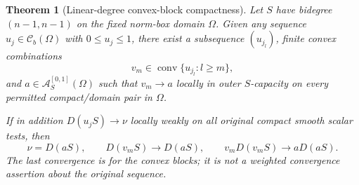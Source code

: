 \documentclass[11pt,a4paper]{article}
\numberwithin{equation}{section}
\newtheorem{theorem}{Theorem}[section]
\theoremstyle{definition}
\theoremstyle{remark}
\newcommand{\Cb}{\mathcal C_b}
\begin{document}
\begin{theorem}[Linear-degree convex-block compactness]
\label{thm:r3-linear-convex-blocks}
Let $S$ have bidegree $(n-1,n-1)$ on the fixed norm-box domain
$\Omega$. Given any sequence $u_j\in\Cb(\Omega)$ with
$0\leq u_j\leq1$, there exist a subsequence $(u_{j_l})$, finite
convex combinations
\[
 v_m\in\operatorname{conv}\{u_{j_l}:l\geq m\},
\]
and $a\in\mathcal A_S^{[0,1]}(\Omega)$ such that
$v_m\to a$ locally in outer $S$-capacity on every permitted
compact/domain pair in $\Omega$.

If in addition $D(u_jS)\to\nu$ locally weakly on all original
compact smooth scalar tests, then
\begin{equation}
\label{eq:r3-linear-weak-representation}
 \nu=D(aS),\qquad
 D(v_mS)\longrightarrow D(aS),\qquad
 v_mD(v_mS)\longrightarrow aD(aS).
\end{equation}
The last convergence is for the convex blocks; it is not a
weighted convergence assertion about the original sequence.
\end{theorem}
\end{document}
